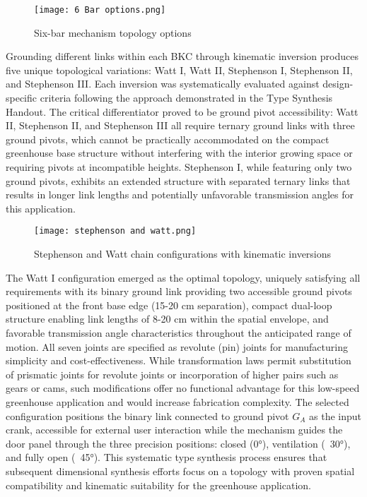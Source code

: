 \documentclass[12pt]{article}
\begin{document}
\begin{figure}[H]
    \centering
    \texttt{[image: 6 Bar options.png]}
    \caption{Six-bar mechanism topology options}
    \label{fig:six_bar_options}
\end{figure}

Grounding different links within each BKC through kinematic inversion produces five unique topological variations: Watt I, Watt II, Stephenson I, Stephenson II, and Stephenson III. Each inversion was systematically evaluated against design-specific criteria following the approach demonstrated in the Type Synthesis Handout. The critical differentiator proved to be ground pivot accessibility: Watt II, Stephenson II, and Stephenson III all require ternary ground links with three ground pivots, which cannot be practically accommodated on the compact greenhouse base structure without interfering with the interior growing space or requiring pivots at incompatible heights. Stephenson I, while featuring only two ground pivots, exhibits an extended structure with separated ternary links that results in longer link lengths and potentially unfavorable transmission angles for this application.

\begin{figure}[H]
    \centering
    \texttt{[image: stephenson and watt.png]}
    \caption{Stephenson and Watt chain configurations with kinematic inversions}
    \label{fig:stephenson_watt}
\end{figure}

The Watt I configuration emerged as the optimal topology, uniquely satisfying all requirements with its binary ground link providing two accessible ground pivots positioned at the front base edge (15-20 cm separation), compact dual-loop structure enabling link lengths of 8-20 cm within the spatial envelope, and favorable transmission angle characteristics throughout the anticipated range of motion. All seven joints are specified as revolute (pin) joints for manufacturing simplicity and cost-effectiveness. While transformation laws permit substitution of prismatic joints for revolute joints or incorporation of higher pairs such as gears or cams, such modifications offer no functional advantage for this low-speed greenhouse application and would increase fabrication complexity. The selected configuration positions the binary link connected to ground pivot $G_A$ as the input crank, accessible for external user interaction while the mechanism guides the door panel through the three precision positions: closed (0°), ventilation (~30°), and fully open (~45°). This systematic type synthesis process ensures that subsequent dimensional synthesis efforts focus on a topology with proven spatial compatibility and kinematic suitability for the greenhouse application.
\end{document}
